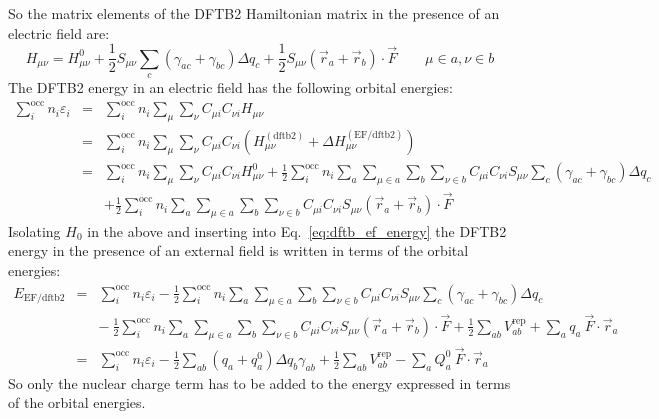 \documentclass{article}
\numberwithin{equation}{section}
\begin{document}
So the matrix elements of the DFTB2 Hamiltonian matrix in the presence of an electric field  are:
\begin{equation}
    H_{\mu\nu} = H^0_{\mu\nu} + \frac{1}{2}S_{\mu\nu} \sum_c \left( \gamma_{ac} + \gamma_{bc} \right)\Delta q_c  + \frac{1}{2} S_{\mu\nu} \left( \vec{r}_a + \vec{r}_b \right) \cdot \vec{F}  \qquad \mu \in a, \nu \in b \label{eq:dftb_ef_hamil}
\end{equation}
The DFTB2 energy in an electric field has the following orbital energies:
\begin{eqnarray}
    \sum_i^\mathrm{occ} n_i \varepsilon_i 
    &=& \sum_i^\mathrm{occ} n_i \sum_{\mu} \sum_{\nu}  C_{\mu i} C_{\nu i} H_{\mu\nu}\nonumber\\
    &=& \sum_i^\mathrm{occ} n_i \sum_{\mu} \sum_{\nu}  C_{\mu i} C_{\nu i} \left(H_{\mu\nu}^{\mathrm{(dftb2)}} + \Delta H_{\mu\nu}^{\mathrm{(EF/dftb2)}} \right)\nonumber\\
    &=& \sum_i^\mathrm{occ} n_i \sum_{\mu} \sum_{\nu}  C_{\mu i} C_{\nu i} H_{\mu\nu}^0
    + \frac{1}{2} \sum_i^\mathrm{occ} n_i \sum_a \sum_{\mu \in a} \sum_b \sum_{\nu \in b}  C_{\mu i} C_{\nu i} S_{\mu\nu} \sum_c \left( \gamma_{ac} + \gamma_{bc} \right)\Delta q_c \nonumber\\
    && + \frac{1}{2} \sum_i^\mathrm{occ} n_i \sum_a \sum_{\mu \in a} \sum_b \sum_{\nu \in b}  C_{\mu i} C_{\nu i} 
    S_{\mu\nu} \left( \vec{r}_a + \vec{r}_b \right) \cdot \vec{F} \label{eq:orbital_energies_ef}
\end{eqnarray}
Isolating $H_0$ in the above and inserting into Eq.~\ref{eq:dftb_ef_energy} the DFTB2 energy in the presence of an external field is written in terms of the orbital energies:
\begin{eqnarray}
    E_\mathrm{EF/dftb2}  
    &=& \sum_i^\mathrm{occ} n_i \varepsilon_i - \frac{1}{2} \sum_i^\mathrm{occ} n_i \sum_a \sum_{\mu \in a} \sum_b \sum_{\nu \in b}  C_{\mu i} C_{\nu i} S_{\mu\nu} \sum_c \left( \gamma_{ac} + \gamma_{bc} \right)\Delta q_c \nonumber\\
    && -\ \frac{1}{2} \sum_i^\mathrm{occ} n_i \sum_a \sum_{\mu \in a} \sum_b \sum_{\nu \in b}  C_{\mu i} C_{\nu i} 
    S_{\mu\nu} \left( \vec{r}_a + \vec{r}_b \right) \cdot \vec{F}  + \frac{1}{2} \sum_{ab} V^\mathrm{rep}_{ab} + \sum_a q_a\ \vec{F} \cdot \vec{r}_a \nonumber\\
    &=& \sum_i^\mathrm{occ} n_i \varepsilon_i - \frac{1}{2}\sum_{ab} \left(q_a + q_a^0 \right)\Delta q_b \gamma_{ab} + \frac{1}{2} \sum_{ab} V^\mathrm{rep}_{ab}  - \sum_a Q^0_a\ \vec{F} \cdot \vec{r}_a
\end{eqnarray}
So only the nuclear charge term has to be added to the energy expressed in terms of the orbital energies.
\end{document}
